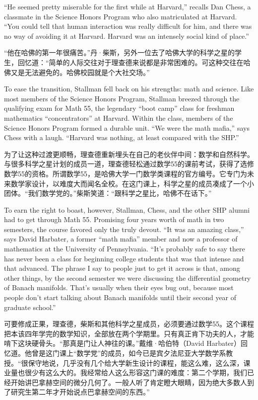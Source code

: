 \ifdefined\eng
``He seemed pretty miserable for the first while at Harvard,'' recalls Dan Chess, a classmate in the Science Honors Program who also matriculated at Harvard. ``You could tell that human interaction was really difficult for him, and there was no way of avoiding it at Harvard. Harvard was an intensely social kind of place.''
\fi

\ifdefined\chs
“他在哈佛的第一年很痛苦。”丹·柴斯，另外一位去了哈佛大学的科学之星的学生，回忆道：“简单的人际交往对于理查德来说都是非常困难的。可这种交往在哈佛又是无法避免的。哈佛校园就是个大社交场。”
\fi

\ifdefined\eng
To ease the transition, Stallman fell back on his strengths: math and science. Like most members of the Science Honors Program, Stallman breezed through the qualifying exam for Math 55, the legendary ``boot camp'' class for freshman mathematics ``concentrators'' at Harvard. Within the class, members of the Science Honors Program formed a durable unit. ``We were the math mafia,'' says Chess with a laugh. ``Harvard was nothing, at least compared with the SHP.''
\fi

\ifdefined\chs
为了让这种过渡更顺畅，理查德重新埋头在自己的老伙伴中间：数学和自然科学。与很多科学之星计划的成员一道，理查德轻松通过数学55的课前考试，获得了选修数学55的资格。所谓数学55，是哈佛大学一门数学类课程的官方编号。它专门为未来数学家设计，以难度大而闻名全校。在这门课上，科学之星的成员凑成了一个小团体。“我们数学党的。”柴斯笑道：“跟科学之星比，哈佛不在话下。”
\fi

\ifdefined\eng
To earn the right to boast, however, Stallman, Chess, and the other SHP alumni had to get through Math 55. Promising four years worth of math in two semesters, the course favored only the truly devout. ``It was an amazing class,'' says David Harbater, a former ``math mafia'' member and now a professor of mathematics at the University of Pennsylvania. ``It's probably safe to say there has never been a class for beginning college students that was that intense and that advanced. The phrase I say to people just to get it across is that, among other things, by the second semester we were discussing the differential geometry of Banach manifolds. That's usually when their eyes bug out, because most people don't start talking about Banach manifolds until their second year of graduate school.''
\fi

\ifdefined\chs
可要修成正果，理查德，柴斯和其他科学之星成员，必须要通过数学55。这个课程把本该四年学完的数学知识，全部放在两个学期里。只有真正肯下功夫的人，才能啃下这块硬骨头。“那真是门让人神往的课。”戴维·哈伯特（David Harbater）回忆道。他曾是这门课上“数学党”的成员，如今已是宾夕法尼亚大学数学系教授。“很保守地说，几乎没有几个给大学新生设计的课程，能这么难，这么深，课业量也很少有这么大的。我经常给人这么形容这门课的难度：第二个学期，我们已经开始讲巴拿赫空间的微分几何了。一般人听了肯定瞪大眼睛，因为绝大多数人到了研究生第二年才开始说点巴拿赫空间的东西。”
\fi

